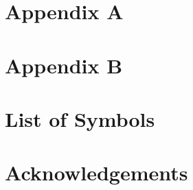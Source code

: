 \documentclass{Configuration_Files/PoliMi3i_thesis}
\begin{document}

\cleardoublepage
{} %
\appendix
\chapter{Appendix A}


\chapter{Appendix B}



\listoffigures

\listoftables

\chapter*{List of Symbols} %


\chapter*{Acknowledgements}


\cleardoublepage
\end{document}
